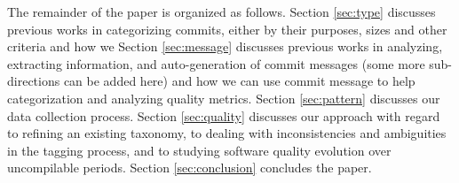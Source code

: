 The remainder of the paper is organized as follows.
Section \ref{sec:type} discusses previous works in categorizing commits, either by their purposes, sizes and other criteria and how we 
Section \ref{sec:message} discusses previous works in analyzing, extracting information, and auto-generation of commit messages (some more sub-directions can be added here) and how we can use commit message to help categorization and analyzing quality metrics.
Section \ref{sec:pattern} discusses our data collection process.
Section \ref{sec:quality} discusses our approach with regard to refining an existing taxonomy, to dealing with inconsistencies and ambiguities in the tagging process, and to studying software quality evolution over uncompilable periods. 
Section \ref{sec:conclusion} concludes the paper.



